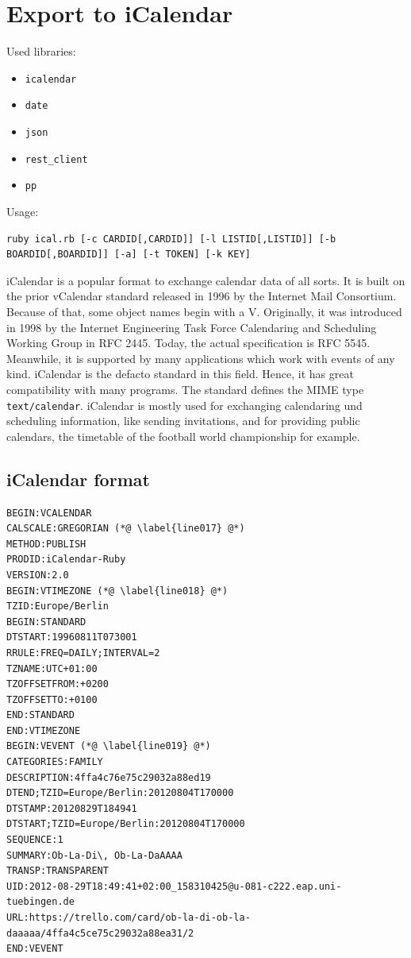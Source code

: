 \section{Export to iCalendar}

Used libraries:
\begin{itemize}
	\item \texttt{icalendar}
	\item \texttt{date}
	\item \texttt{json}
	\item \texttt{rest\_client}
	\item \texttt{pp}
\end{itemize}

Usage:
\begin{lstlisting}[aboveskip=1\baselineskip, style=bash, caption=\texttt{ical.rb} usage., label=listing023]
ruby ical.rb [-c CARDID[,CARDID]] [-l LISTID[,LISTID]] [-b BOARDID[,BOARDID]] [-a] [-t TOKEN] [-k KEY]
\end{lstlisting}

iCalendar is a popular format to exchange calendar data of all sorts. It is built on the prior vCalendar standard released in 1996 by the Internet Mail Consortium. \cite{vcalendar} Because of that, some object names begin with a V. Originally, it was introduced in 1998 by the Internet Engineering Task Force Calendaring and Scheduling Working Group in RFC 2445. \cite{rfc:2445} Today, the actual specification is RFC 5545. \cite{rfc:5545} Meanwhile, it is supported by many applications which work with events of any kind. iCalendar is the defacto standard in this field. Hence, it has great compatibility with many programs. The standard defines the MIME type \texttt{text/calendar}. iCalendar is mostly used for exchanging calendaring und scheduling information, like sending invitations, and for providing public calendars, the timetable of the football world championship for example.

\subsection{iCalendar format}

\begin{lstlisting}[aboveskip=1\baselineskip, style=bash, caption=iCalendar example., label=listing024]
BEGIN:VCALENDAR
CALSCALE:GREGORIAN (*@ \label{line017} @*)
METHOD:PUBLISH
PRODID:iCalendar-Ruby
VERSION:2.0
BEGIN:VTIMEZONE (*@ \label{line018} @*)
TZID:Europe/Berlin
BEGIN:STANDARD
DTSTART:19960811T073001
RRULE:FREQ=DAILY;INTERVAL=2
TZNAME:UTC+01:00
TZOFFSETFROM:+0200
TZOFFSETTO:+0100
END:STANDARD
END:VTIMEZONE
BEGIN:VEVENT (*@ \label{line019} @*)
CATEGORIES:FAMILY
DESCRIPTION:4ffa4c76e75c29032a88ed19
DTEND;TZID=Europe/Berlin:20120804T170000
DTSTAMP:20120829T184941
DTSTART;TZID=Europe/Berlin:20120804T170000
SEQUENCE:1
SUMMARY:Ob-La-Di\, Ob-La-DaAAAA
TRANSP:TRANSPARENT
UID:2012-08-29T18:49:41+02:00_158310425@u-081-c222.eap.uni-tuebingen.de
URL:https://trello.com/card/ob-la-di-ob-la-daaaaa/4ffa4c5ce75c29032a88ea31/2
END:VEVENT
\end{lstlisting}


